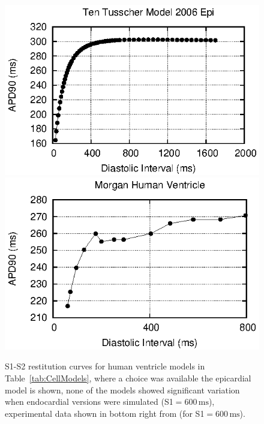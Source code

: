 \documentclass[preprint,authoryear,12pt]{elsarticle}
\newcommand{\vu}[2]{\ensuremath{#1\,\mathrm{#2}}}
\begin{document}
\begin{figure}
\begin{center}
\includegraphics[width=0.32\linewidth]{ten_tusscher_model_2006_epi_s1s2_curve}
\includegraphics[width=0.32\linewidth]{morgan_human_ventricle_s1s2_curve}
\caption{S1-S2 restitution curves for human ventricle models in
Table~\ref{tab:CellModels}, where a choice was available the epicardial model is
shown, none of the models showed significant variation when endocardial versions
were simulated (S1$ = \vu{600}{ms}$), experimental data shown in bottom right from
\citet{morgan1992} (for S1$=\vu{600}{ms}$).}
\label{fig:S1S2_Curves:human}
\end{center}
\end{figure}
\end{document}
